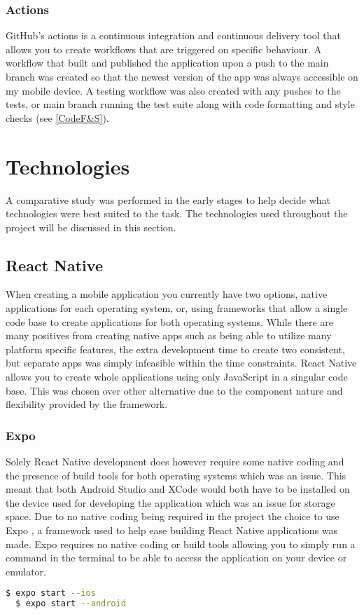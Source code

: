 \subsubsection{Actions}
GitHub's actions is a continuous integration and continuous delivery tool that allows you to create workflows that are triggered on specific behaviour. A workflow that built and published the application upon a push to the main branch was created so that the newest version of the app was always accessible on my mobile device. A testing workflow was also created with any pushes to the tests, or main branch running the test suite along with code formatting and style checks (see \ref{CodeF&S}).
\section{Technologies}
A comparative study \cite{compStudy} was performed in the early stages to help decide what technologies were best suited to the task. The technologies used throughout the project will be discussed in this section.
\subsection{React Native}
When creating a mobile application you currently have two options, native applications for each operating system, or, using frameworks that allow a single code base to create applications for both operating systems. While there are many positives from creating native apps such as being able to utilize many platform specific features, the extra development time to create two consistent, but separate apps was simply infeasible within the time constraints. React Native \cite{reactnative} allows you to create whole applications using only JavaScript \cite{js} in a singular code base. This was chosen over other alternative due to the component nature and flexibility provided by the framework. 
\subsubsection{Expo}
Solely React Native development does however require some native coding and the presence of build tools for both operating systems which was an issue. This meant that both Android Studio and XCode would both have to be installed on the device used for developing the application which was an issue for storage space. Due to no native coding being required in the project the choice to use Expo \cite{expo}, a framework used to help ease building React Native applications was made. Expo requires no native coding or build tools allowing you to simply run a command in the terminal to be able to access the application on your device or emulator.\begin{lstlisting}[language=bash, caption=To build and start applications with expo for iOS or Android]
  $ expo start --ios
  $ expo start --android
\end{lstlisting}
